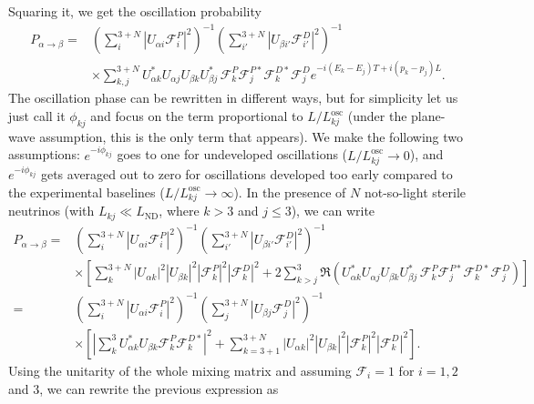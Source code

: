 Squaring it, we get the oscillation probability
\begin{align}
P_{\alpha \to \beta} =  &\left({\sum_{i}^{3+N} |U_{\alpha i} \mathcal{F}_i^P|^2 }\right)^{-1} \left({\sum_{i'}^{3+N} |U_{\beta i'} \mathcal{F}_{i'}^D|^2 }\right)^{-1} \\ \nonumber & \times  \sum_{k, j}^{3+N} U_{\alpha k}^{*} U_{\alpha j} U_{\beta k} U_{\beta j}^* \, \mathcal{F}_k^P \mathcal{F}_j^{P*} \mathcal{F}_k^{D*}\mathcal{F}_j^{D} e^{- i (E_k - E_j)T + i (p_k-p_j) L}.
\end{align}
The oscillation phase can be rewritten in different ways, but for simplicity let us just call it $\phi_{k j}$ and focus on the term proportional to $L/L^{\text{osc}}_{k j}$ (under the plane-wave assumption, this is the only term that appears). We make the following two assumptions: $e^{-i \phi_{k j}}$ goes to one for undeveloped oscillations ($L/L^{\text{osc}}_{k j} \to 0$), and $e^{-i \phi_{k j}}$ gets averaged out to zero for oscillations developed too early compared to the experimental baselines ($L/L^{\text{osc}}_{k j} \to \infty$). In the presence of $N$ not-so-light sterile neutrinos (with $L_{k j} \ll L_{\text{ND}}$, where $k > 3$ and $j \leq 3$), we can write
\begin{align}
P_{\alpha \to \beta} =  &\left({\sum_{i}^{3+N} |U_{\alpha i} \mathcal{F}_i^P|^2 }\right)^{-1} \left({\sum_{i'}^{3+N} |U_{\beta i'} \mathcal{F}_{i'}^D|^2 }\right)^{-1} \\ \nonumber & \times \left[\sum_{k}^{3+N} |U_{\alpha k}|^2|U_{\beta k}|^2 |\mathcal{F}_k^P|^2 |\mathcal{F}_k^D|^2 + 2 \sum_{k > j}^{3}\Re{\left( U_{\alpha k}^{*} U_{\alpha j} U_{\beta k} U_{\beta j}^* \, \mathcal{F}_k^P \mathcal{F}_j^{P*} \mathcal{F}_k^{D*}\mathcal{F}_j^{D} \right)}\right] \nonumber \\
% 
= &\left({\sum_{i}^{3+N} |U_{\alpha i} \mathcal{F}_i^P|^2 }\right)^{-1} \left({\sum_{j}^{3+N} |U_{\beta j} \mathcal{F}_j^D|^2 }\right)^{-1} \\ \nonumber & \times \left[\left| \sum_{k}^{3} U_{\alpha k}^* U_{\beta k} \mathcal{F}_k^P \mathcal{F}_k^{D*} \right|^2 + \sum_{k=3+1}^{3+N} |U_{\alpha k}|^2 |U_{\beta k}|^2 |\mathcal{F}_k^P|^2 |\mathcal{F}_k^D|^2\right].
\end{align}%
%
Using the unitarity of the whole mixing matrix and assuming $\mathcal{F}_i = 1$ for $i = 1,2$ and $3$, we can rewrite the previous expression as
%
